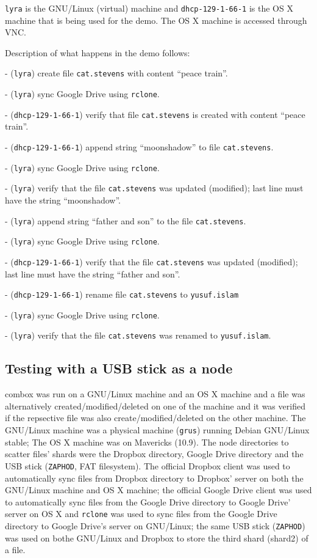 \verb+lyra+ is the GNU/Linux (virtual) machine and
\verb+dhcp-129-1-66-1+ is the OS X machine that is being used for the
demo. The OS X machine is accessed through VNC\cite{article:vnc}.

Description of what happens in the demo follows:

  - (\verb+lyra+) create file \verb+cat.stevens+ with content ``peace train''.

  - (\verb+lyra+) sync Google Drive using \verb+rclone+.

  - (\verb+dhcp-129-1-66-1+) verify that file \verb+cat.stevens+ is
  created with content ``peace train''.

  - (\verb+dhcp-129-1-66-1+) append string ``moonshadow'' to file
  \verb+cat.stevens+.

  - (\verb+lyra+) sync Google Drive using \verb+rclone+.

  - (\verb+lyra+) verify that the file \verb+cat.stevens+ was updated
  (modified); last line must have the string ``moonshadow''.

  - (\verb+lyra+) append string ``father and son'' to the file
  \verb+cat.stevens+.

  - (\verb+lyra+) sync Google Drive using \verb+rclone+.

  - (\verb+dhcp-129-1-66-1+) verify that the file \verb+cat.stevens+
  was updated (modified); last line must have the string ``father and
  son''.

  - (\verb+dhcp-129-1-66-1+) rename file \verb+cat.stevens+ to
  \verb+yusuf.islam+

  - (\verb+lyra+) sync Google Drive using \verb+rclone+.

  - (\verb+lyra+) verify that the file \verb+cat.stevens+ was renamed
  to \verb+yusuf.islam+.

\subsection{Testing with a USB stick as a node}

combox was run on a GNU/Linux machine and an OS X machine and a file
was alternatively created/modified/deleted on one of the machine and
it was verified if the repsective file was also
create/modified/deleted on the other machine. The GNU/Linux machine
was a physical machine (\verb+grus+) running Debian GNU/Linux stable;
The OS X machine was on Mavericks (10.9). The node directories to
scatter files' shards were the Dropbox directory, Google Drive
directory and the USB stick (\verb+ZAPHOD+, FAT filesystem). The
official Dropbox client was used to automatically sync files from
Dropbox directory to Dropbox' server on both the GNU/Linux machine and
OS X machine; the official Google Drive client was used to
automatically sync files from the Google Drive directory to Google
Drive' server on OS X and \verb+rclone+\cite{program:rclone} was used
to sync files from the Google Drive directory to Google Drive's server
on GNU/Linux; the same USB stick (\verb+ZAPHOD+) was used on bothe
GNU/Linux and Dropbox to store the third shard (shard2) of a file.

